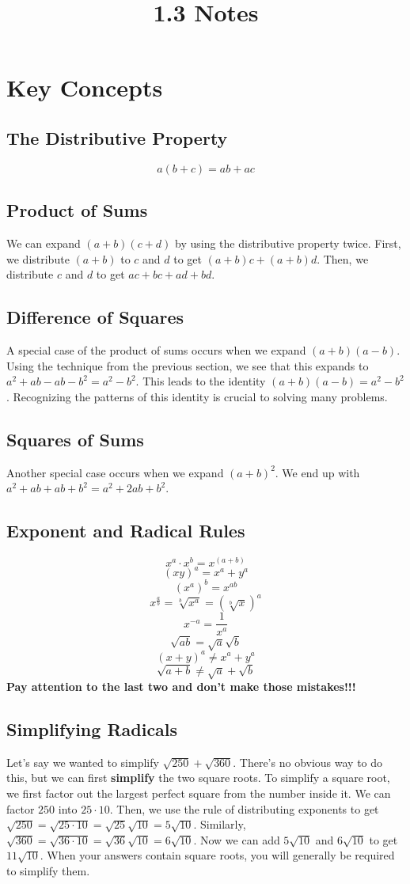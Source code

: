 \documentclass{article}
\title{1.3 Notes}
\author{}
\date{}
\begin{document}
    \maketitle
    \section*{Key Concepts}
    \subsection*{The Distributive Property}
    \[a(b + c) = ab + ac\]
    \subsection*{Product of Sums}
    We can expand $(a + b)(c + d)$ by using the distributive property twice.
    First, we distribute $(a + b)$ to $c$ and $d$ to get $(a + b)c + (a + b)d$.
    Then, we distribute $c$ and $d$ to get $ac + bc + ad + bd$.
    \subsection*{Difference of Squares}
    A special case of the product of sums occurs when we expand $(a + b)(a -
    b)$. Using the technique from the previous section, we see that this expands
    to $a^2 + ab - ab - b^2 = a^2 - b^2$. This leads to the identity $(a + b)(a
    - b) = a^2 - b^2$. Recognizing the patterns of this identity is crucial to
    solving many problems.
    \subsection*{Squares of Sums}
    Another special case occurs when we expand $(a + b)^2$. We end up with $a^2
    + ab + ab + b^2 = a^2 + 2ab + b^2$.
    \subsection*{Exponent and Radical Rules}
    \[x^a \cdot x^b = x^{(a + b)}\]
    \[(xy)^a = x^a + y^a\]
    \[(x^a)^b = x^{ab}\]
    \[x^{\frac{a}{b}} = \sqrt[b]{x^a} = \left(\sqrt[b]{x}\right)^a\]
    \[x^{-a} = \frac{1}{x^a}\]
    \[\sqrt{ab} = \sqrt{a}\sqrt{b}\]
    \[(x + y)^a \neq x^a + y^a\]
    \[\sqrt{a + b} \neq \sqrt{a} + \sqrt{b}\]
    \textbf{Pay attention to the last two and don't make those mistakes!!!}
    \subsection*{Simplifying Radicals}
    Let's say we wanted to simplify $\sqrt{250} + \sqrt{360}$. There's no
    obvious way to do this, but we can first \textbf{simplify} the two square
    roots. To simplify a square root, we first factor out the largest perfect
    square from the number inside it. We can factor $250$ into $25 \cdot 10$.
    Then, we use the rule of distributing exponents to get $\sqrt{250} =
    \sqrt{25 \cdot 10} = \sqrt{25}\sqrt{10} = 5\sqrt{10}$. Similarly,
    $\sqrt{360} = \sqrt{36 \cdot 10} = \sqrt{36}\sqrt{10} = 6\sqrt{10}$. Now we
    can add $5\sqrt{10}$ and $6\sqrt{10}$ to get $11\sqrt{10}$. When your
    answers contain square roots, you will generally be required to simplify
    them.
\end{document}
